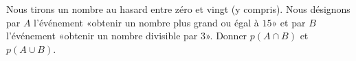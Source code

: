 
\begin{exercice}\label{exosmath-0215}

    Nous tirons un nombre au hasard entre zéro et vingt (y compris). Nous désignons par \( A\) l'événement «obtenir un nombre plus grand ou égal à \( 15\)» et par \( B\) l'événement «obtenir un nombre divisible par \( 3\)». Donner \( p(A\cap B)\) et \( p(A\cup B)\).

\end{exercice}
